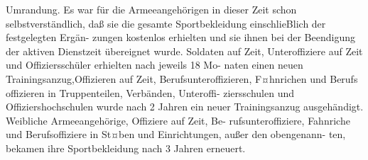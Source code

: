 Umrandung.
Es war für die Armeeangehörigen in dieser Zeit
schon selbstverständlich, daß sie die gesamte Sportbekleidung einschlieBlich der festgelegten Ergän-
zungen kostenlos erhielten und sie ihnen bei der
Beendigung der aktiven Dienstzeit übereignet
wurde. Soldaten auf Zeit, Unteroffiziere auf Zeit
und Offiziersschüler erhielten nach jeweils 18 Mo-
naten einen neuen Trainingsanzug,Offizieren auf
Zeit, Berufsunteroffizieren, F¤hnrichen und Berufs
offizieren in Truppenteilen, Verbänden, Unteroffi-
ziersschulen und Offiziershochschulen wurde nach
2 Jahren ein neuer Trainingsanzug ausgehändigt. Weibliche Armeeangehörige, Offiziere auf Zeit, Be-
rufsunteroffiziere, Fahnriche und Berufsoffiziere in
St¤ben und Einrichtungen, außer den obengenann-
ten, bekamen ihre Sportbekleidung nach 3 Jahren
erneuert.